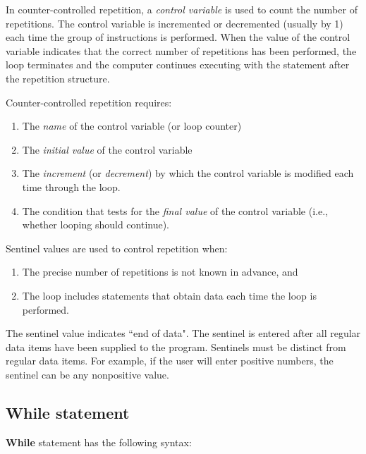 \documentclass[a4paper,12pt]{book}
\begin{document}
In counter-controlled repetition, a {\em control variable} is used to count the number of repetitions.  The control variable is incremented or decremented (usually by 1) each time the group of instructions is performed.  When the value of the control variable indicates that the correct number of repetitions has been performed, the loop terminates and the computer continues executing with the statement after the repetition structure.

Counter-controlled repetition requires:
\begin{enumerate}
\item The {\em name} of the control variable (or loop counter)
\item The {\em initial value} of the control variable
\item The {\em increment} (or {\em decrement}) by which the control variable is modified each time through the loop.
\item The condition that tests for the {\em final value} of the control variable (i.e., whether looping should continue).
\end{enumerate}

Sentinel values are used to control repetition when:
\begin{enumerate}
\item The precise number of repetitions is not known in advance, and
\item The loop includes statements that obtain data each time the loop is performed.
\end{enumerate}

The sentinel value indicates ``end of data". The sentinel is entered after all regular data items have been supplied to the program. Sentinels must be distinct from regular data items. For example, if the user will enter positive numbers, the sentinel can be any nonpositive value.

\subsection{While statement}
{\bf While} statement has the following syntax:
\begin{center}
\end{center}
\end{document}
